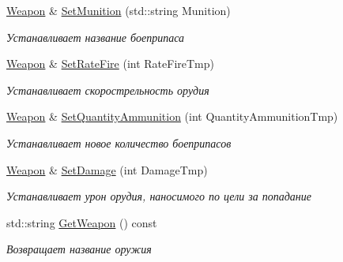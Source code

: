 \begin{DoxyCompactItemize}
\mbox{\hyperlink{class_aircraft_carrier_group_1_1_weapon}{Weapon}} \& \mbox{\hyperlink{class_aircraft_carrier_group_1_1_weapon_af026b090b1f5230fdaf68ffcc481eba3}{Set\+Munition}} (std\+::string Munition)
\begin{DoxyCompactList}\small\item\em Устанавливает название боеприпаса \end{DoxyCompactList}\item 
\mbox{\hyperlink{class_aircraft_carrier_group_1_1_weapon}{Weapon}} \& \mbox{\hyperlink{class_aircraft_carrier_group_1_1_weapon_a8f83ea62a85411992eb53634fc43b011}{Set\+Rate\+Fire}} (int Rate\+Fire\+Tmp)
\begin{DoxyCompactList}\small\item\em Устанавливает скорострельность орудия \end{DoxyCompactList}\item 
\mbox{\hyperlink{class_aircraft_carrier_group_1_1_weapon}{Weapon}} \& \mbox{\hyperlink{class_aircraft_carrier_group_1_1_weapon_a9fd2fbb263336abbbc9d12c51a9de3c1}{Set\+Quantity\+Ammunition}} (int Quantity\+Ammunition\+Tmp)
\begin{DoxyCompactList}\small\item\em Устанавливает новое количество боеприпасов \end{DoxyCompactList}\item 
\mbox{\hyperlink{class_aircraft_carrier_group_1_1_weapon}{Weapon}} \& \mbox{\hyperlink{class_aircraft_carrier_group_1_1_weapon_a5d8ce784fb56b4f84f028d92dcae7a25}{Set\+Damage}} (int Damage\+Tmp)
\begin{DoxyCompactList}\small\item\em Устанавливает урон орудия, наносимого по цели за попадание \end{DoxyCompactList}\item 
\mbox{\label{class_aircraft_carrier_group_1_1_weapon_a25b4126359e6c564624708a19aa6ed60}} 
std\+::string \mbox{\hyperlink{class_aircraft_carrier_group_1_1_weapon_a25b4126359e6c564624708a19aa6ed60}{Get\+Weapon}} () const
\begin{DoxyCompactList}\small\item\em Возвращает название оружия \end{DoxyCompactList}\item 
\mbox{\label{class_aircraft_carrier_group_1_1_weapon_af7bc46055c221b56bedd89f0ae72b0f9}} 

\end{DoxyCompactItemize}
